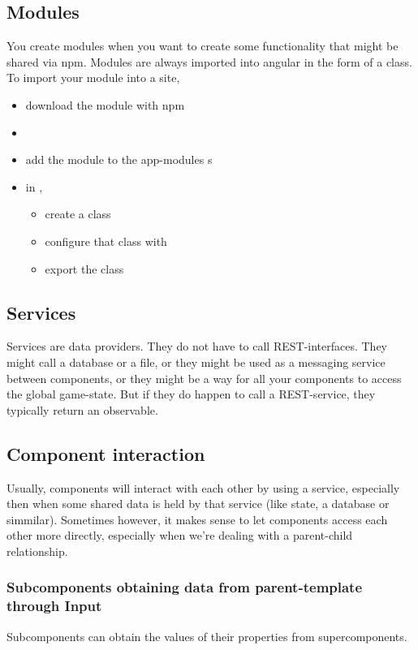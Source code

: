 \subsection{Modules}
You create modules when you want to create some functionality that might be shared via npm. 
Modules are always imported into angular in the form of a class. To import your module into a site, 
\begin{itemize}
    \item download the module with npm
    \item {}
    \item add the module to the app-modules s
    \item in , 
        \begin{itemize}
            \item create a class 
            \item configure that class with 
            \item export the class
        \end{itemize}
\end{itemize}


\subsection{Services}
Services are data providers. They do not have to call REST-interfaces. They might call a database or a file, or they might be used as a messaging service between components, or they might be a way for all your components to access the global game-state. But if they do happen to call a REST-service, they typically return an observable.





\subsection{Component interaction}
Usually, components will interact with each other by using a service, especially then when some shared data is held by that service (like state, a database or simmilar). Sometimes however, it makes sense to let components access each other more directly, especially when we're dealing with a parent-child relationship.

\subsubsection{Subcomponents obtaining data from parent-template through Input}
Subcomponents can obtain the values of their properties from supercomponents. 

